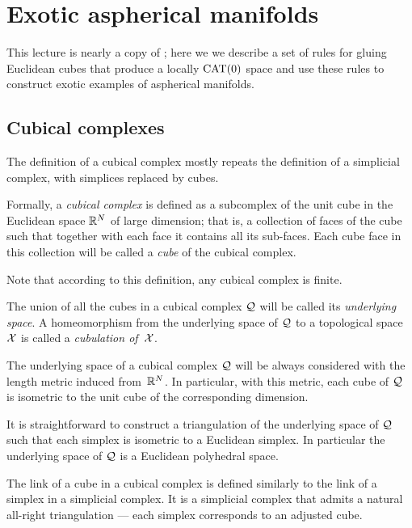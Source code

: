 \chapter{Exotic aspherical manifolds}\label{chapter:aspherical}

This lecture is nearly a copy of \cite[Sections 3.6--3.8]{alexander-kapovitch-petrunin-2019};
here we we describe a set of rules for gluing Euclidean cubes that produce a 
locally $\mathrm{CAT}(0)$ space and use these rules to construct exotic examples of aspherical manifolds.

\section{Cubical complexes}

The definition of a cubical complex
mostly repeats the definition of a simplicial complex, 
with simplices replaced by cubes.

Formally, a \emph{cubical complex} is defined as a subcomplex 
of the unit cube in the Euclidean space $\mathbb{R}^N$ of large dimension;
that is, a collection of faces of the cube
such that together with each face it contains all its sub-faces.
Each cube face in this collection 
will be called a \emph{cube} of the cubical complex.

Note that according to this definition, 
any cubical complex is finite.

The union of all the cubes in a cubical complex $\mathcal{Q}$ will be called its \emph{underlying space}.
A homeomorphism from the underlying space of $\mathcal{Q}$ to a topological space $\mathcal{X}$ is called a \emph{cubulation of}~$\mathcal{X}$.

The underlying space of a cubical complex $\mathcal{Q}$ will be always considered with the length metric
induced from~$\mathbb{R}^N$.
In particular, with this metric, 
each cube of $\mathcal{Q}$ is isometric to the unit cube of the corresponding dimension.

It is straightforward to construct a triangulation 
of the underlying space of $\mathcal{Q}$ 
such that each simplex is isometric to a Euclidean simplex.
In particular the underlying space of $\mathcal{Q}$ is a Euclidean polyhedral space.

The link of a cube in a cubical complex is defined similarly to the link of a simplex in a simplicial complex.
It is a simplicial complex that admits a natural all-right triangulation --- each simplex corresponds to an adjusted cube.

